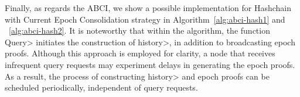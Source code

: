 Finally, as regards the ABCI, we show a possible implementation for Hashchain
with Current Epoch Consolidation strategy in Algorithm~\ref{alg:abci-hash1} and ~\ref{alg:abci-hash2}. It is
noteworthy that within the algorithm, the function \<Query> initiates the construction
of \<history>, in addition to broadcasting epoch proofs. Although this approach is employed
for clarity, a node that receives infrequent query requests may experiment delays in
generating the epoch proofs. As a result, the process of constructing \<history> and
epoch proofs can be scheduled periodically, independent of query requests.



%

